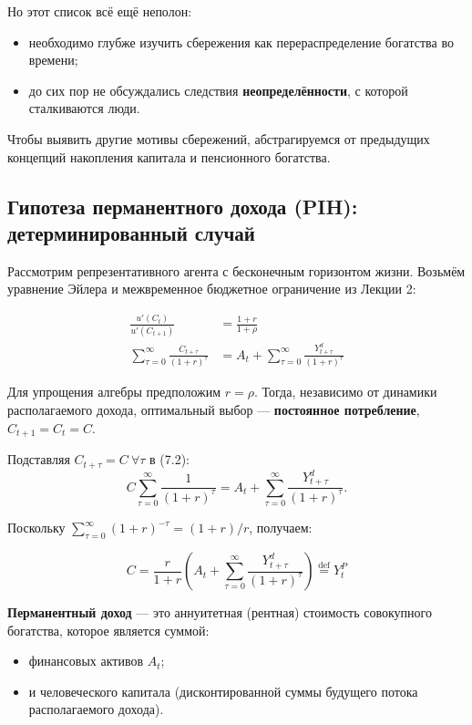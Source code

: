 \documentclass[10pt,a4paper]{article}
\begin{document}
Но этот список всё ещё неполон:
\begin{itemize}[leftmargin=1.3em]
\item необходимо глубже изучить сбережения как перераспределение богатства во времени;
\item до сих пор не обсуждались следствия \textbf{неопределённости}, с которой сталкиваются люди.
\end{itemize}

Чтобы выявить другие мотивы сбережений, абстрагируемся от предыдущих концепций накопления капитала и пенсионного богатства.

\subsection{Гипотеза перманентного дохода (PIH): детерминированный случай}

Рассмотрим репрезентативного агента с бесконечным горизонтом жизни. Возьмём уравнение Эйлера и межвременное бюджетное ограничение из Лекции 2:
\begin{formulabox}
\begin{align}
\frac{u'(C_t)}{u'(C_{t+1})} &= \frac{1+r}{1+\rho} \tag{7.1}\\
\sum_{\tau=0}^{\infty} \frac{C_{t+\tau}}{(1+r)^\tau} &= A_t + \sum_{\tau=0}^{\infty} \frac{Y_{t+\tau}^{d}}{(1+r)^\tau} \tag{7.2}
\end{align}
\end{formulabox}

Для упрощения алгебры предположим $r=\rho$. Тогда, независимо от динамики располагаемого дохода, оптимальный выбор — \textbf{постоянное потребление}, $C_{t+1}=C_t=C$.

Подставляя $C_{t+\tau}=C\ \forall\tau$ в (7.2):
$$C\sum_{\tau=0}^{\infty}\frac{1}{(1+r)^\tau} = A_t + \sum_{\tau=0}^{\infty}\frac{Y_{t+\tau}^d}{(1+r)^\tau}.$$

Поскольку $\sum_{\tau=0}^{\infty}(1+r)^{-\tau} = (1+r)/r$, получаем:
\begin{formulabox}
\begin{equation}
C = \frac{r}{1+r}\left(A_t + \sum_{\tau=0}^{\infty}\frac{Y_{t+\tau}^d}{(1+r)^\tau}\right) \overset{\text{def}}{=} Y_t^{P} \tag{7.3}
\end{equation}
\end{formulabox}

\textbf{Перманентный доход} — это аннуитетная (рентная) стоимость совокупного богатства, которое является суммой:
\begin{itemize}[leftmargin=1.3em]
\item финансовых активов $A_t$;
\item и человеческого капитала (дисконтированной суммы будущего потока располагаемого дохода).
\end{itemize}
\end{document}
